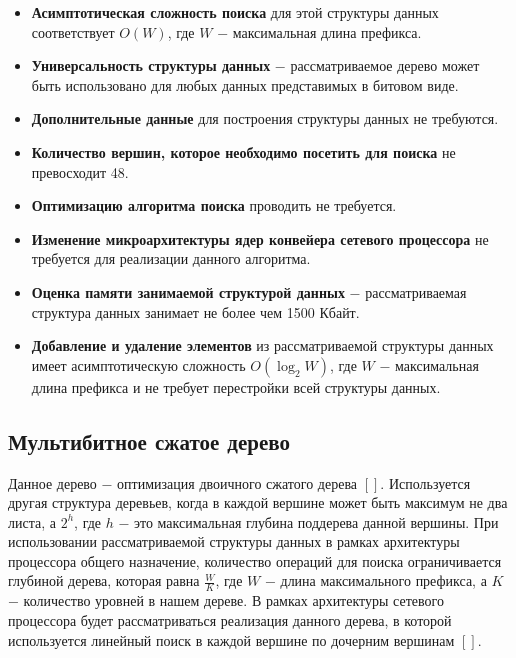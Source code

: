\documentclass[a4peper, 12pt, titlepage, finall]{report}
\begin{document}
            \begin{itemize}
                \item\textbf{Асимптотическая сложность поиска} для этой структуры данных соответствует {\ttfamily $O(W)$},
                где {\ttfamily $W$} $-$ максимальная длина префикса.
                \item\textbf{Универсальность структуры данных} $-$ рассматриваемое дерево может быть использовано для любых данных представимых в битовом виде.
                \item\textbf{Дополнительные данные} для построения структуры данных не требуются.
                \item\textbf{Количество вершин, которое необходимо посетить для поиска} не превосходит 48.
                \item\textbf{Оптимизацию алгоритма поиска} проводить не требуется.
                \item\textbf{Изменение микроархитектуры ядер конвейера сетевого процессора} не требуется для реализации данного алгоритма.
                \item\textbf{Оценка памяти занимаемой структурой данных} $-$ рассматриваемая структура данных занимает не более чем 1500 Кбайт.
                \item\textbf{Добавление и удаление элементов} из рассматриваемой структуры данных имеет асимптотическую сложность 
                {\ttfamily $O(\log_2{W})$}, где {\ttfamily $W$} $-$ максимальная длина префикса и не требует перестройки всей структуры данных.
            \end{itemize}
        \subsection{Мультибитное сжатое дерево}
            Данное дерево $-$ оптимизация двоичного сжатого дерева $[ ]$. Используется другая структура деревьев, когда в каждой вершине
            может быть максимум не два листа, а {\ttfamily $2^h$}, где {\ttfamily $h$} $-$ это максимальная глубина поддерева данной вершины.
            При использовании рассматриваемой структуры данных в рамках архитектуры процессора общего назначение, количество операций для поиска ограничивается глубиной дерева,
            которая равна {\ttfamily $\frac{W}{K}$}, где {\ttfamily $W$} $-$ длина максимального префикса, а {\ttfamily $K$} $-$ количество уровней в нашем дереве.
            В рамках архитектуры сетевого процессора будет рассматриваться реализация данного дерева, в которой используется линейный поиск в каждой вершине по дочерним вершинам $[ ]$.
\end{document}
